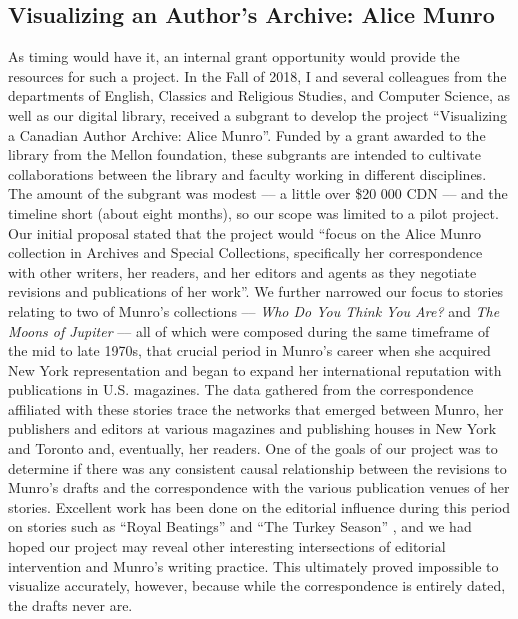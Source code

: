 \documentclass{article}
\begin{document}
\subsection*{Visualizing an Author's Archive: Alice Munro}

As timing would have it, an internal grant opportunity would provide the
resources for such a project. In the Fall of 2018, I and several colleagues
from the departments of English, Classics and Religious Studies, and
Computer Science, as well as our digital library, received a subgrant to
develop the project ``Visualizing a Canadian Author Archive: Alice
Munro''. Funded by a grant awarded to the library from the Mellon
foundation, these subgrants are intended to cultivate collaborations
between the library and faculty working in different disciplines. The
amount of the subgrant was modest –– a little over \$20 000 CDN –– and the
timeline short (about eight months), so our scope was limited to a pilot
project. Our initial proposal stated that the project would ``focus on
the Alice Munro collection in Archives and Special Collections,
specifically her correspondence with other writers, her readers, and her
editors and agents as they negotiate revisions and publications of her
work''. We further narrowed our focus to stories relating to two of
Munro's collections –– \emph{Who Do You Think You Are?} \citep{munro_who_1977} and
\emph{The Moons of Jupiter} \citep{munro_moons_1983} –– all of which were composed during
the same timeframe of the mid to late 1970s, that crucial period in
Munro's career when she acquired New York representation and began to
expand her international reputation with publications in U.S. magazines.
The data gathered from the correspondence affiliated with these stories
trace the networks that emerged between Munro, her publishers and
editors at various magazines and publishing houses in New York and
Toronto and, eventually, her readers. One of the goals of our project
was to determine if there was any consistent causal relationship between
the revisions to Munro's drafts and the correspondence with the various
publication venues of her stories. Excellent work has been done on the
editorial influence during this period on stories such as ``Royal
Beatings'' \citep{beran_luxury_1998} and ``The Turkey Season'' \citep{fladd_alice_2015}, and we had hoped
our project may reveal other interesting intersections of editorial
intervention and Munro's writing practice. This ultimately proved impossible to visualize accurately, however, because while the correspondence is entirely dated, the drafts never are.
\end{document}
